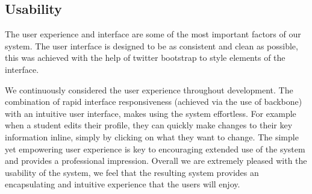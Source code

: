 \subsection{Usability}
The user experience and interface are some of the most important factors of our system. The user interface is designed to be as consistent and clean as possible, this was achieved with the help of twitter bootstrap to style elements of the interface.

We continuously considered the user experience throughout development. The combination of rapid interface responsiveness (achieved via the use of backbone) with an intuitive user interface, makes using the system effortless. For example when a student edits their profile, they can quickly make changes to their key information inline, simply by clicking on what they want to change. The simple yet empowering user experience is key to encouraging extended use of the system and provides a professional impression. Overall we are extremely pleased with the usability of the system, we feel that the resulting system provides an encapsulating and intuitive experience that the users will enjoy.